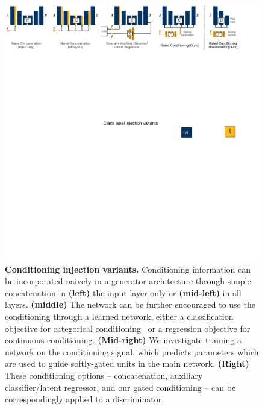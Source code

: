 
\begin{figure}[t]
    \centering
    \includegraphics[width=\linewidth]{paper_images/arch_inject.pdf}
    \caption{{\bf Conditioning injection variants.}
    Conditioning information can be incorporated naively in a generator architecture through simple concatenation in {\bf (left)} the input layer only or {\bf (mid-left)} in all layers. {\bf (middle)} The network can be further encouraged to use the conditioning through a learned network, either a classification objective for categorical conditioning~\cite{odena2016conditional,chen2016infogan} or a regression objective for continuous conditioning. {\bf (Mid-right)} We investigate training a network on the conditioning signal, which predicts parameters which are used to guide softly-gated units in the main network. {\bf (Right)} These conditioning options -- concatenation, auxiliary classifier/latent regressor, and our gated conditioning -- can be correspondingly applied to a discriminator.\label{fig:arch-inj} }
\end{figure}

